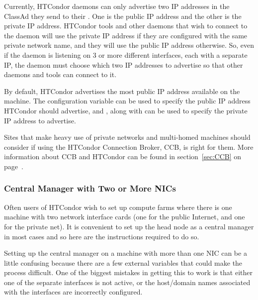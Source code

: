 \begin{description}
  Currently, HTCondor daemons can only advertise two IP addresses in
  the ClassAd they send to their .  One is the
  public IP address and the other is the private IP address.
  HTCondor tools and other daemons that wish to connect to the daemon will
  use the private IP address if they are configured with the same private
  network name, and they will use the public IP address otherwise.
  So, even if the daemon is listening on 3 or more different interfaces,
  each with a separate IP, the daemon must choose which two IP addresses to
  advertise so that other daemons and tools can connect to it.

  By default, HTCondor advertises the most public IP address available
  on the machine.
  The  configuration variable can be used 
  to specify the public IP address HTCondor should advertise, and
  , along with
   can be used to specify the
  private IP address to advertise.

\end{description}

Sites that make heavy use of private networks and multi-homed machines
should consider if using the HTCondor Connection Broker, CCB,
is right for them.
More information about CCB and HTCondor can be found in
section~\ref{sec:CCB} on page~\pageref{sec:CCB}.


\subsubsection{Central Manager with Two or More NICs}

Often users of HTCondor wish to set up compute farms where there is one
machine with two network interface cards (one for the public Internet,
and one for the private net). It is convenient to set up the head
node as a central manager in most cases and so here are the instructions
required to do so.

Setting up the central manager on a machine with more than one NIC can
be a little confusing because there are a few external variables
that could make the process difficult. One of the biggest mistakes
in getting this to work is that either one of the separate interfaces is
not active, or the host/domain names associated with the interfaces are
incorrectly configured. 

